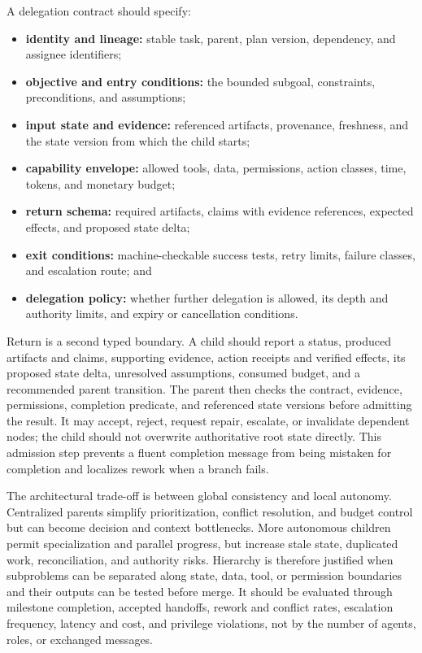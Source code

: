 A delegation contract should specify:
\begin{itemize}
    \item \textbf{identity and lineage:} stable task, parent, plan version, dependency, and assignee identifiers;
    \item \textbf{objective and entry conditions:} the bounded subgoal, constraints, preconditions, and assumptions;
    \item \textbf{input state and evidence:} referenced artifacts, provenance, freshness, and the state version from which the child starts;
    \item \textbf{capability envelope:} allowed tools, data, permissions, action classes, time, tokens, and monetary budget;
    \item \textbf{return schema:} required artifacts, claims with evidence references, expected effects, and proposed state delta;
    \item \textbf{exit conditions:} machine-checkable success tests, retry limits, failure classes, and escalation route; and
    \item \textbf{delegation policy:} whether further delegation is allowed, its depth and authority limits, and expiry or cancellation conditions.
\end{itemize}

Return is a second typed boundary. A child should report a status, produced artifacts and claims, supporting evidence, action receipts and verified effects, its proposed state delta, unresolved assumptions, consumed budget, and a recommended parent transition. The parent then checks the contract, evidence, permissions, completion predicate, and referenced state versions before admitting the result. It may accept, reject, request repair, escalate, or invalidate dependent nodes; the child should not overwrite authoritative root state directly. This admission step prevents a fluent completion message from being mistaken for completion and localizes rework when a branch fails.

The architectural trade-off is between global consistency and local autonomy. Centralized parents simplify prioritization, conflict resolution, and budget control but can become decision and context bottlenecks. More autonomous children permit specialization and parallel progress, but increase stale state, duplicated work, reconciliation, and authority risks. Hierarchy is therefore justified when subproblems can be separated along state, data, tool, or permission boundaries and their outputs can be tested before merge. It should be evaluated through milestone completion, accepted handoffs, rework and conflict rates, escalation frequency, latency and cost, and privilege violations, not by the number of agents, roles, or exchanged messages.

